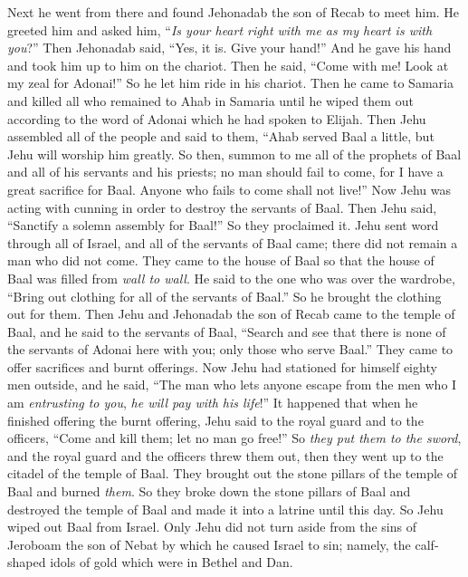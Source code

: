 \begin{biblechapter}
\verse Next he went from there and found Jehonadab the son of Recab to meet him. He greeted him and asked him, “\textit{Is your heart right with me as my heart is with you}?” Then Jehonadab said, “Yes, it is. Give your hand!” And he gave his hand and took him up to him on the chariot.
\verse Then he said, “Come with me! Look at my zeal for Adonai!” So he let him ride in his chariot.
\verse Then he came to Samaria and killed all who remained to Ahab in Samaria until he wiped them out according to the word of Adonai which he had spoken to Elijah.
 Then Jehu assembled all of the people and said to them, “Ahab served Baal a little, but Jehu will worship him greatly.
\verse So then, summon to me all of the prophets of Baal and all of his servants and his priests; no man should fail to come, for I have a great sacrifice for Baal. Anyone who fails to come shall not live!” Now Jehu was acting with cunning in order to destroy the servants of Baal.
\verse Then Jehu said, “Sanctify a solemn assembly for Baal!” So they proclaimed it.
\verse Jehu sent word through all of Israel, and all of the servants of Baal came; there did not remain a man who did not come. They came to the house of Baal so that the house of Baal was filled from \textit{wall to wall}.
\verse He said to the one who was over the wardrobe, “Bring out clothing for all of the servants of Baal.” So he brought the clothing out for them.
\verse Then Jehu and Jehonadab the son of Recab came to the temple of Baal, and he said to the servants of Baal, “Search and see that there is none of the servants of Adonai here with you; only those who serve Baal.”
\verse They came to offer sacrifices and burnt offerings. Now Jehu had stationed for himself eighty men outside, and he said, “The man who lets anyone escape from the men who I am \textit{entrusting to you}, \textit{he will pay with his life}!”
\verse It happened that when he finished offering the burnt offering, Jehu said to the royal guard and to the officers, “Come and kill them; let no man go free!” So \textit{they put them to the sword}, and the royal guard and the officers threw them out, then they went up to the citadel of the temple of Baal.
\verse They brought out the stone pillars of the temple of Baal and burned \textit{them}.
\verse So they broke down the stone pillars of Baal and destroyed the temple of Baal and made it into a latrine until this day.
\verse So Jehu wiped out Baal from Israel.
\verse Only Jehu did not turn aside from the sins of Jeroboam the son of Nebat by which he caused Israel to sin; namely, the calf-shaped idols of gold which were in Bethel and Dan.

\end{biblechapter}
